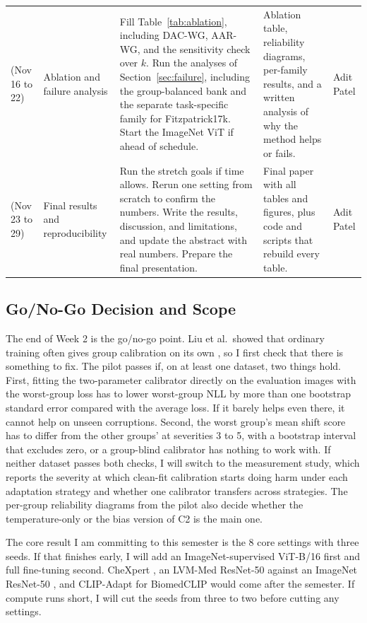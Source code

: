 \documentclass[sigconf,nonacm]{acmart}
\begin{document}
\begin{table}[t]
\begin{tabularx}{\textwidth}{@{}P{1.3cm}P{2.1cm}LP{4.6cm}P{1.15cm}@{}}
     (Nov 16 to 22) & Ablation and failure analysis & Fill Table~\ref{tab:ablation}, including DAC-WG, AAR-WG, and the sensitivity check over $k$. Run the analyses of Section~\ref{sec:failure}, including the group-balanced bank and the separate task-specific family for Fitzpatrick17k. Start the ImageNet ViT if ahead of schedule. & Ablation table, reliability diagrams, per-family results, and a written analysis of why the method helps or fails. & Adit Patel \\
     (Nov 23 to 29) & Final results and reproducibility & Run the stretch goals if time allows. Rerun one setting from scratch to confirm the numbers. Write the results, discussion, and limitations, and update the abstract with real numbers. Prepare the final presentation. & Final paper with all tables and figures, plus code and scripts that rebuild every table. & Adit Patel \\
    \bottomrule
  \end{tabularx}
\end{table}

\subsection{Go/No-Go Decision and Scope}
\label{sec:gonogo}

The end of Week 2 is the go/no-go point. Liu et al.\ showed that ordinary training often gives group calibration on its own \cite{liu2019implicit}, so I first check that there is something to fix. The pilot passes if, on at least one dataset, two things hold. First, fitting the two-parameter calibrator directly on the evaluation images with the worst-group loss has to lower worst-group NLL by more than one bootstrap standard error compared with the average loss. If it barely helps even there, it cannot help on unseen corruptions. Second, the worst group's mean shift score has to differ from the other groups' at severities 3 to 5, with a bootstrap interval that excludes zero, or a group-blind calibrator has nothing to work with. If neither dataset passes both checks, I will switch to the measurement study, which reports the severity at which clean-fit calibration starts doing harm under each adaptation strategy and whether one calibrator transfers across strategies. The per-group reliability diagrams from the pilot also decide whether the temperature-only or the bias version of C2 is the main one.

The core result I am committing to this semester is the 8 core settings with three seeds. If that finishes early, I will add an ImageNet-supervised ViT-B/16 \cite{dosovitskiy2021vit} first and full fine-tuning second. CheXpert \cite{irvin2019chexpert}, an LVM-Med ResNet-50 against an ImageNet ResNet-50 \cite{nguyen2023lvmmed,he2016resnet}, and CLIP-Adapt for BiomedCLIP would come after the semester. If compute runs short, I will cut the seeds from three to two before cutting any settings.
\end{document}
